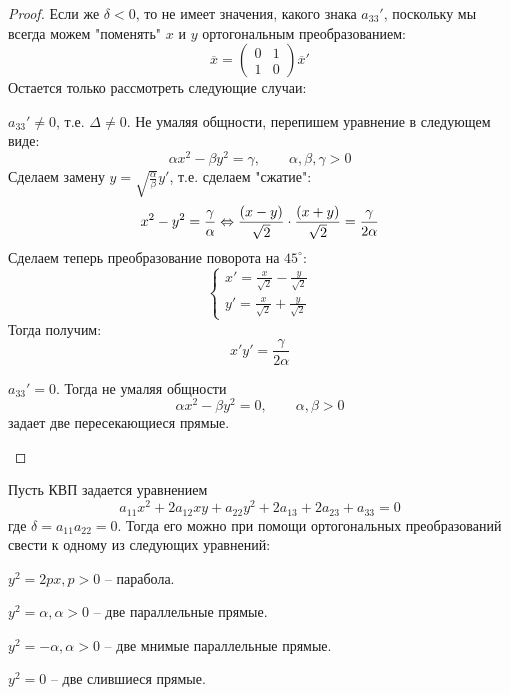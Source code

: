 \begin{proof}
	Если же $\delta < 0$, то не имеет значения, какого знака $a_{33}'$, поскольку мы всегда можем "поменять" $x$ и $y$ ортогональным преобразованием:
	\[\overline{x} = \left(\begin{array}{cc}
	0 & 1 \\ 
	1 & 0
	\end{array}\right) \overline{x}'\]
	Остается только рассмотреть следующие случаи:
	\begin{MyList}
		\item $a_{33}' \neq 0$, т.е. $\Delta \neq 0$.
		Не умаляя общности, перепишем уравнение в следующем виде:
		\[\alpha x^2 - \beta y^2 = \gamma, \qquad \alpha, \beta, \gamma > 0\]	
		Сделаем замену $y = \sqrt{\frac{\alpha}{\beta}} y'$, т.е. сделаем "сжатие":
		\[x^2 - y^2 = \frac{\gamma}{\alpha} \Leftrightarrow \frac{(x - y)}{\sqrt{2}} \cdot \frac{(x + y)}{\sqrt{2}} = \frac{\gamma}{2\alpha}\]
		Сделаем теперь преобразование поворота на $45^\circ$:
		\[\begin{cases}
			x' = \frac{x}{\sqrt{2}} - \frac{y}{\sqrt{2}} \\
			y' = \frac{x}{\sqrt{2}} + \frac{y}{\sqrt{2}} 
		\end{cases}\]  
		Тогда получим:
		\[x'y' = \frac{\gamma}{2\alpha}\]

		\begin{figure}[H]
			\centering
			\def\svgwidth{.7\columnwidth}
			
		\end{figure}

		\item $a_{33}' = 0$. Тогда не умаляя общности
		\[\alpha x^2 - \beta y^2 = 0, \qquad \alpha, \beta > 0\]
		задает две пересекающиеся прямые.
	\end{MyList} 
\end{proof}


\begin{Thm}
	Пусть КВП задается уравнением
	\[a_{11} x^2 + 2a_{12} xy + a_{22} y^2 + 2a_{13} + 2a_{23} + a_{33} = 0\]
	где $\delta = a_{11} a_{22} = 0$. Тогда его можно при помощи ортогональных преобразований свести к одному из следующих уравнений:
	\begin{MyList}
		\item $y^2 = 2px, p > 0$ -- парабола.
		\item $y^2 = \alpha, \alpha > 0$ -- две параллельные прямые.
		\item $y^2 = -\alpha, \alpha > 0$ -- две мнимые параллельные прямые.
		\item $y^2 = 0$ -- две слившиеся прямые.
	\end{MyList}
\end{Thm}

